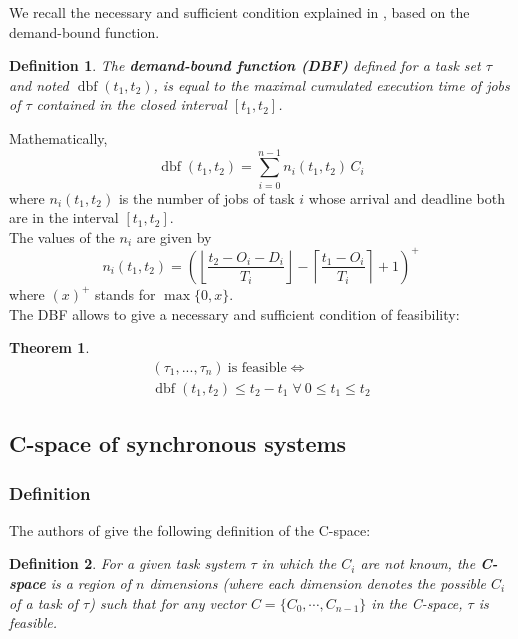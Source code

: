 \documentclass[times, 10pt,twocolumn, a4paper]{article}
\newtheorem{theorem}{Theorem}
\newtheorem{definition}{Definition}
\newcommand{\dbf}[1]{\operatorname{dbf}(#1)}
\begin{document}
  We recall the necessary and sufficient condition explained in \cite{baruah1999generalized, baruah1990algorithms}, based on the demand-bound function.

  \begin{definition}
  The \textbf{demand-bound function (DBF)}
  \cite{baruah1999generalized, baruah1990algorithms} defined for a task set
  $\tau$ and noted $\dbf{t_1, t_2}$, is equal to the maximal cumulated execution
  time of jobs of $\tau$ contained in the closed interval $[t_1, t_2]$.
  \end{definition}

  Mathematically,
  \[
    \dbf{t_1, t_2} = \sum_{i=0}^{n-1} n_i(t_1, t_2) \, C_i
  \]
  where $n_i(t_1, t_2)$ is the number of jobs of task $i$ whose arrival and
  deadline both are in the interval $[t_1, t_2]$.\\

The values of the $n_i$ are given by
\[
  n_i(t_1, t_2) = \left( \left\lfloor \frac{t_2 - O_i -
  D_i}{T_i} \right\rfloor - \left\lceil \frac{t_1 - O_i}{T_i} \right\rceil + 1 \right)^{+}
\]
where $(x)^+$ stands for $\max \{ 0, x \}$.\\

The DBF allows to give a necessary and sufficient condition of feasibility:

\begin{theorem}
\[
  \begin{array}{c}
    (\tau_1, ..., \tau_n) \: \text{is feasible}  \iff \\
    \dbf{t_1, t_2} \leq t_2 - t_1 \; \forall \: 0 \leq t_1 \leq t_2
  \end{array}
\]
\end{theorem}

  \subsection{C-space of synchronous systems}

    \subsubsection{Definition}

The authors of \cite{george2009characterization} give the following definition of the C-space:
\begin{definition}
For a given task system $\tau$ in which the $C_i$ are not known, the \textbf{C-space} is a region of $n$ dimensions (where each dimension denotes the possible $C_i$ of a task of $\tau$) such that for any vector $C = \{ C_0, \cdots, C_{n-1}\}$ in the C-space, $\tau$ is feasible.
\end{definition}
\end{document}
